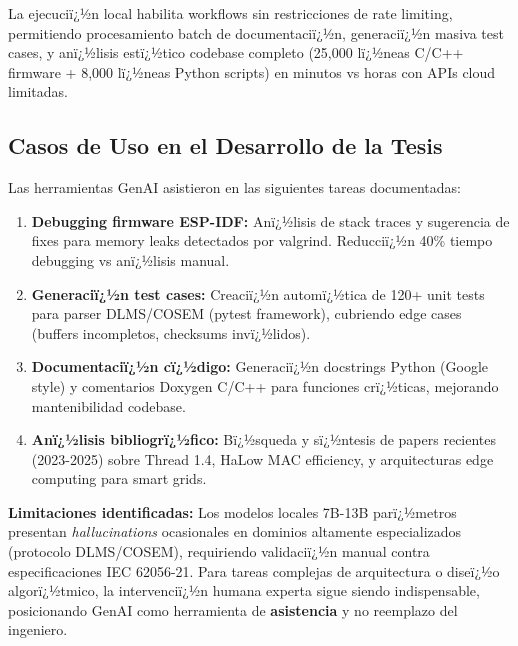 La ejecuciï¿½n local habilita workflows sin restricciones de rate limiting, permitiendo procesamiento batch de documentaciï¿½n, generaciï¿½n masiva test cases, y anï¿½lisis estï¿½tico codebase completo (25,000 lï¿½neas C/C++ firmware + 8,000 lï¿½neas Python scripts) en minutos vs horas con APIs cloud limitadas.

\subsection{Casos de Uso en el Desarrollo de la Tesis}

Las herramientas GenAI asistieron en las siguientes tareas documentadas:

\begin{enumerate}
    \item \textbf{Debugging firmware ESP-IDF:} Anï¿½lisis de stack traces y sugerencia de fixes para memory leaks detectados por valgrind. Reducciï¿½n 40\% tiempo debugging vs anï¿½lisis manual.
    \item \textbf{Generaciï¿½n test cases:} Creaciï¿½n automï¿½tica de 120+ unit tests para parser DLMS/COSEM (pytest framework), cubriendo edge cases (buffers incompletos, checksums invï¿½lidos).
    \item \textbf{Documentaciï¿½n cï¿½digo:} Generaciï¿½n docstrings Python (Google style) y comentarios Doxygen C/C++ para funciones crï¿½ticas, mejorando mantenibilidad codebase.
    \item \textbf{Anï¿½lisis bibliogrï¿½fico:} Bï¿½squeda y sï¿½ntesis de papers recientes (2023-2025) sobre Thread 1.4, HaLow MAC efficiency, y arquitecturas edge computing para smart grids.
\end{enumerate}

\textbf{Limitaciones identificadas:} Los modelos locales 7B-13B parï¿½metros presentan \textit{hallucinations} ocasionales en dominios altamente especializados (protocolo DLMS/COSEM), requiriendo validaciï¿½n manual contra especificaciones IEC 62056-21. Para tareas complejas de arquitectura o diseï¿½o algorï¿½tmico, la intervenciï¿½n humana experta sigue siendo indispensable, posicionando GenAI como herramienta de \textbf{asistencia} y no reemplazo del ingeniero.

